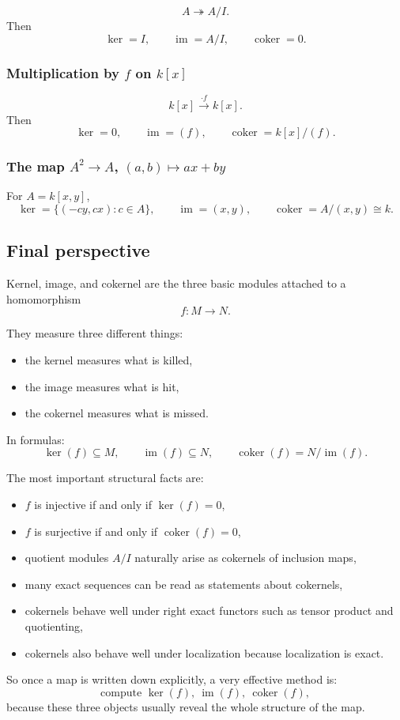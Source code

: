 \documentclass[12pt,a4paper]{article}
\theoremstyle{notespace}
\theoremstyle{definition}
\begin{document}
\[
A\twoheadrightarrow A/I.
\]
Then
\[
\ker=I,
\qquad
\operatorname{im}=A/I,
\qquad
\operatorname{coker}=0.
\]

\subsubsection*{Multiplication by \(f\) on \(k[x]\)}

\[
k[x]\xrightarrow{\cdot f}k[x].
\]
Then
\[
\ker=0,
\qquad
\operatorname{im}=(f),
\qquad
\operatorname{coker}=k[x]/(f).
\]

\subsubsection*{The map \(A^2\to A\), \((a,b)\mapsto ax+by\)}

For \(A=k[x,y]\),
\[
\ker=\{(-cy,cx):c\in A\},
\qquad
\operatorname{im}=(x,y),
\qquad
\operatorname{coker}=A/(x,y)\cong k.
\]

\subsection{ Final perspective}

Kernel, image, and cokernel are the three basic modules attached to a homomorphism
\[
f:M\to N.
\]

They measure three different things:
\begin{itemize}
	\item the kernel measures what is killed,
	\item the image measures what is hit,
	\item the cokernel measures what is missed.
\end{itemize}

In formulas:
\[
\ker(f)\subseteq M,
\qquad
\operatorname{im}(f)\subseteq N,
\qquad
\operatorname{coker}(f)=N/\operatorname{im}(f).
\]

The most important structural facts are:
\begin{itemize}
	\item \(f\) is injective if and only if \(\ker(f)=0\),
	\item \(f\) is surjective if and only if \(\operatorname{coker}(f)=0\),
	\item quotient modules \(A/I\) naturally arise as cokernels of inclusion maps,
	\item many exact sequences can be read as statements about cokernels,
	\item cokernels behave well under right exact functors such as tensor product and quotienting,
	\item cokernels also behave well under localization because localization is exact.
\end{itemize}

So once a map is written down explicitly, a very effective method is:
\[
\text{compute } \ker(f),\ \operatorname{im}(f),\ \operatorname{coker}(f),
\]
because these three objects usually reveal the whole structure of the map.
\end{document}
